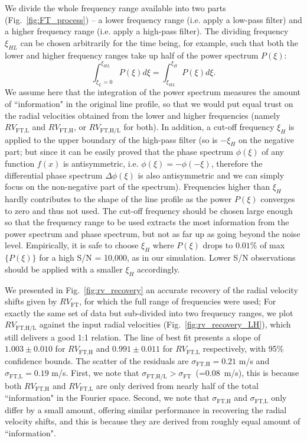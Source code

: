 We divide the whole frequency range available into two parts (Fig.~\ref{fig:FT_process}) -- a lower frequency range (i.e. apply a low-pass filter) and a higher frequency range (i.e. apply a high-pass filter). The dividing frequency $\xi_{HL}$ can be chosen arbitrarily for the time being, for example, such that both the lower and higher frequency ranges take up half of the power spectrum $P(\xi)$:
\begin{equation}
	\int_{\xi_{L}=0}^{\xi_{HL}} P(\xi) d\xi = \int_{\xi_{HL}}^{\xi_{H}} P(\xi) d\xi. 
\end{equation}
We assume here that the integration of the power spectrum measures the amount of ``information" in the original line profile, so that we would put equal trust on the radial velocities obtained from the lower and higher frequencies (namely $RV_\text{FT,L}$ and $RV_\text{FT,H}$, or $RV_\text{FT,H/L}$ for both). In addition, a cut-off frequency $\xi_{H}$ is applied to the upper boundary of the high-pass filter (so is $-\xi_{H}$ on the negative part; but since it can be easily proved that the phase spectrum $\phi(\xi)$ of any function $f(x)$ is antisymmetric, i.e. $\phi(\xi) = -\phi(-\xi)$, therefore the differential phase spectrum $\Delta \phi(\xi)$ is also antisymmetric and we can simply focus on the non-negative part of the spectrum). Frequencies higher than $\xi_{H}$ hardly contributes to the shape of the line profile as the power $P(\xi)$ converges to zero and thus not used. The cut-off frequency should be chosen large enough so that the frequency range to be used extracts the most information from the power spectrum and phase spectrum, but not as far up as going beyond the noise level. Empirically, it is safe to choose $\xi_{H}$ where $P(\xi)$ drops to $0.01\%$ of max$\{P(\xi)\}$ for a high S/N = 10,000, as in our simulation. Lower S/N observations should be applied with a smaller $\xi_{H}$ accordingly. 

We presented in Fig.~\ref{fig:rv_recovery} an accurate recovery of the radial velocity shifts given by $RV_\text{FT}$, for which the full range of frequencies were used; For exactly the same set of data but sub-divided into two frequency ranges, we plot $RV_\text{FT,H/L}$ against the input radial velocities (Fig.~\ref{fig:rv_recovery_LH}), which still delivers a good 1:1 relation. The line of best fit presents a slope of $1.003\pm0.010$ for $RV_\text{FT,H}$ and $0.991\pm0.011$ for $RV_\text{FT,L}$ respectively, with 95\% confidence bounds. The scatter of the residuals are $\sigma_\text{FT,H} = 0.21$ m/s and $\sigma_\text{FT,L} = 0.19$ m/s. First, we note that $\sigma_\text{FT,H/L} > \sigma_\text{FT}$~(=0.08~m/s), this is because both $RV_\text{FT,H}$ and $RV_\text{FT,L}$ are only derived from nearly half of the total ``information" in the Fourier space. Second, we note that $\sigma_\text{FT,H}$ and $\sigma_\text{FT,L}$ only differ by a small amount, offering similar performance in recovering the radial velocity shifts, and this is because they are derived from roughly equal amount of ``information". 

